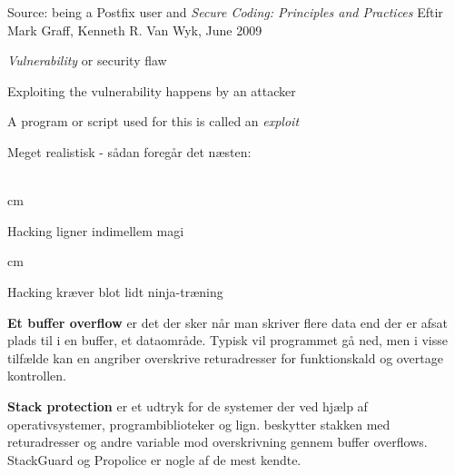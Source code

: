 \documentclass[Screen16to9,17pt]{foils}
\begin{document}
Source: being a Postfix user and \emph{Secure Coding: Principles and Practices}
Eftir Mark Graff, Kenneth R. Van Wyk, June 2009






\begin{list1}
\item \emph{Vulnerability} or security flaw
\item Exploiting the vulnerability happens by an attacker
\item A program or script used for this is called an \emph{exploit}
\end{list1}







Meget realistisk - sådan foregår det næsten:\\
\\





 cm

\centerline{Hacking ligner indimellem  magi}




 cm
\centerline{Hacking kræver blot lidt ninja-træning}




\begin{list1}
\item {\bfseries Et buffer overflow}
er det der sker når man skriver flere data end der er afsat plads til
i en buffer, et dataområde. Typisk vil programmet gå ned, men i visse
tilfælde kan en angriber overskrive returadresser for funktionskald og
overtage kontrollen.
\item {\bfseries Stack protection}
er et udtryk for de systemer der ved hjælp af operativsystemer,
programbiblioteker og lign. beskytter stakken med returadresser og
andre variable mod overskrivning gennem buffer overflows. StackGuard
og Propolice er nogle af de mest kendte.
\end{list1}
\end{document}
